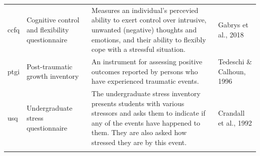 \documentclass[]{book}
\begin{document}
\begin{longtable}[]{@{}llll@{}}
\begin{minipage}[t]{0.22\columnwidth}\raggedright
ccfq\strut
\end{minipage} & \begin{minipage}[t]{0.27\columnwidth}\raggedright
Cognitive control and flexibility questionnaire\strut
\end{minipage} & \begin{minipage}[t]{0.22\columnwidth}\raggedright
Measures an individual's percevied ability to exert control over intrusive, unwanted (negative) thoughts and emotions, and their ability to flexibly cope with a stressful situation.\strut
\end{minipage} & \begin{minipage}[t]{0.18\columnwidth}\raggedright
Gabrys et al., 2018\strut
\end{minipage}\tabularnewline
\begin{minipage}[t]{0.22\columnwidth}\raggedright
ptgi\strut
\end{minipage} & \begin{minipage}[t]{0.27\columnwidth}\raggedright
Post-traumatic growth inventory\strut
\end{minipage} & \begin{minipage}[t]{0.22\columnwidth}\raggedright
An instrument for assessing positive outcomes reported by persons who have experienced traumatic events.\strut
\end{minipage} & \begin{minipage}[t]{0.18\columnwidth}\raggedright
Tedeschi \& Calhoun, 1996\strut
\end{minipage}\tabularnewline
\begin{minipage}[t]{0.22\columnwidth}\raggedright
usq\strut
\end{minipage} & \begin{minipage}[t]{0.27\columnwidth}\raggedright
Undergraduate stress questionnaire\strut
\end{minipage} & \begin{minipage}[t]{0.22\columnwidth}\raggedright
The undergraduate stress inventory presents students with various stressors and asks them to indicate if any of the events have happened to them. They are also asked how stressed they are by this event.\strut
\end{minipage} & \begin{minipage}[t]{0.18\columnwidth}\raggedright
Crandall et al., 1992\strut
\end{minipage}\tabularnewline
\begin{minipage}[t]{0.22\columnwidth}\raggedright

\end{minipage}
\end{longtable}
\end{document}

